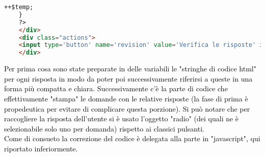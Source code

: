 \begin{lstlisting}[language=html]
		++$temp;
	}
	?>
	</div>
	<div class="actions">
	<input type='button' name='revision' value='Verifica le risposte' id='revision' onclick='check()'/>
	</div>
\end{lstlisting}

\textcolor{black}{Per prima cosa sono state preparate in delle variabili le "stringhe di codice html" per ogni risposta in modo da poter poi successivamente riferirsi a queste in una forma più compatta e chiara. Successivamente c'è la parte di codice che effettivamente "stampa" le domande con le relative risposte (la fase di prima è propedeutica per evitare di complicare questa porzione). Si può notare che per raccogliere la risposta dell'utente si è usato l'oggetto "radio" (dei quali ne è selezionabile solo uno per domanda) rispetto ai classici pulsanti.\\ 
Come di consueto la correzione del codice è delegata alla parte in "javascript", qui riportato inferiormente.}\\

